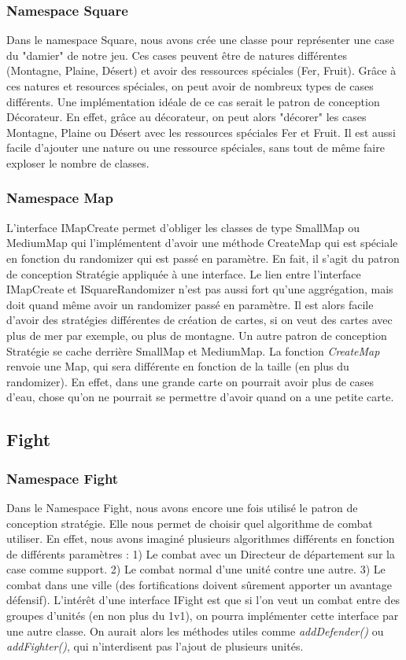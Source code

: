 			\subsubsection{Namespace Square}
				Dans le namespace Square, nous avons crée une classe pour représenter une case du "damier" de notre jeu.
			Ces cases peuvent être de natures différentes (Montagne, Plaine, Désert) et avoir des ressources spéciales (Fer, Fruit).
			Grâce à ces natures et resources spéciales, on peut avoir de nombreux types de cases différents.
			Une implémentation idéale de ce cas serait le patron de conception Décorateur.
			En effet, grâce au décorateur, on peut alors "décorer" les cases Montagne, Plaine ou Désert avec les ressources spéciales Fer et Fruit.
			Il est aussi facile d'ajouter une nature ou une ressource spéciales, sans tout de même faire exploser le nombre de classes.
			
			\subsubsection{Namespace Map}
				L'interface IMapCreate permet d'obliger les classes de type SmallMap ou MediumMap qui l'implémentent d'avoir une méthode CreateMap qui est spéciale en fonction du randomizer qui est passé en paramètre.
			En fait, il s'agit du patron de conception Stratégie appliquée à une interface.
			Le lien entre l'interface IMapCreate et ISquareRandomizer n'est pas aussi fort qu'une aggrégation, mais doit quand même avoir un randomizer passé en paramètre.
			Il est alors facile d'avoir des stratégies différentes de création de cartes, si on veut des cartes avec plus de mer par exemple, ou plus de montagne.
				Un autre patron de conception Stratégie se cache derrière SmallMap et MediumMap. La fonction \textit{CreateMap} renvoie une Map, qui sera différente en fonction de la taille (en plus du randomizer).
			En effet, dans une grande carte on pourrait avoir plus de cases d'eau, chose qu'on ne pourrait se permettre d'avoir quand on a une petite carte.	
	
	\subsection{Fight}
		\subsubsection{Namespace Fight}
			Dans le Namespace Fight, nous avons encore une fois utilisé le patron de conception stratégie.
			Elle nous permet de choisir quel algorithme de combat utiliser.
			En effet, nous avons imaginé plusieurs algorithmes différents en fonction de différents paramètres :
				1) Le combat avec un Directeur de département sur la case comme support.
				2) Le combat normal d'une unité contre une autre.
				3) Le combat dans une ville (des fortifications doivent sûrement apporter un avantage défensif).
			L'intérêt d'une interface IFight est que si l'on veut un combat entre des groupes d'unités (en non plus du 1v1), on pourra implémenter cette interface par une autre classe.
			On aurait alors les méthodes utiles comme \textit{addDefender()} ou \textit{addFighter()}, qui n'interdisent pas l'ajout de plusieurs unités.
		
